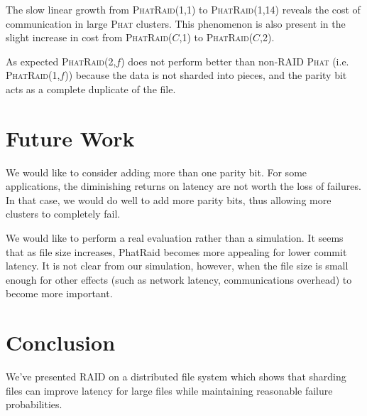 \documentclass[10pt,letter]{article}
\newcommand{\phat}[0]{\textsc{Phat}}
\newcommand{\phatraidcf}[2]{\textsc{PhatRaid}(#1,#2)}
\begin{document}
The slow linear growth from \phatraidcf{1}{1} to \phatraidcf{1}{14} reveals the
cost of communication in large \phat{} clusters. This phenomenon is also present
in the slight increase in cost from \phatraidcf{$C$}{1} to \phatraidcf{$C$}{2}.

As expected \phatraidcf{2}{$f$} does not perform better than non-RAID \phat{}
(i.e. \phatraidcf{1}{$f$}) because the data is not sharded into pieces, and the
parity bit acts as a complete duplicate of the file.

\section{Future Work}

We would like to consider adding more than one parity bit. For some
applications, the diminishing returns on latency are not worth the loss of
failures. In that case, we would do well to add more parity bits, thus allowing
more clusters to completely fail.

We would like to perform a real evaluation rather than a simulation.  It seems
that as file size increases, PhatRaid becomes more appealing for lower commit
latency. It is not clear from our simulation, however, when the file size is
small enough for other effects (such as network latency, communications
overhead) to become more important.

\section{Conclusion}

We've presented RAID on a distributed file system which shows that sharding
files can improve latency for large files while maintaining reasonable failure
probabilities.



\end{document}
